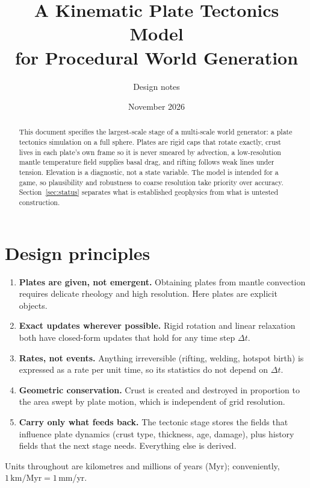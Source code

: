 \documentclass[11pt,a4paper]{article}
\title{A Kinematic Plate Tectonics Model\\for Procedural World Generation}
\author{Design notes}
\date{November 2026}
\newcommand{\km}{\,\mathrm{km}}
\begin{document}
\maketitle

\begin{abstract}
\noindent This document specifies the largest-scale stage of a multi-scale
world generator: a plate tectonics simulation on a full sphere. Plates are
rigid caps that rotate exactly, crust lives in each plate's own frame so it is
never smeared by advection, a low-resolution mantle temperature field supplies
basal drag, and rifting follows weak lines under tension. Elevation is a
diagnostic, not a state variable. The model is intended for a game, so
plausibility and robustness to coarse resolution take priority over accuracy.
Section~\ref{sec:status} separates what is established geophysics from what is
untested construction.
\end{abstract}

\section{Design principles}

\begin{enumerate}[leftmargin=*]
\item \textbf{Plates are given, not emergent.} Obtaining plates from mantle
convection requires delicate rheology and high resolution. Here plates are
explicit objects.
\item \textbf{Exact updates wherever possible.} Rigid rotation and linear
relaxation both have closed-form updates that hold for any time step
$\Delta t$.
\item \textbf{Rates, not events.} Anything irreversible (rifting, welding,
hotspot birth) is expressed as a rate per unit time, so its statistics do not
depend on $\Delta t$.
\item \textbf{Geometric conservation.} Crust is created and destroyed in
proportion to the area swept by plate motion, which is independent of grid
resolution.
\item \textbf{Carry only what feeds back.} The tectonic stage stores the
fields that influence plate dynamics (crust type, thickness, age, damage),
plus history fields that the next stage needs. Everything else is derived.
\end{enumerate}

Units throughout are kilometres and millions of years (Myr); conveniently,
$1\km/\mathrm{Myr} = 1$\,mm/yr.
\end{document}
